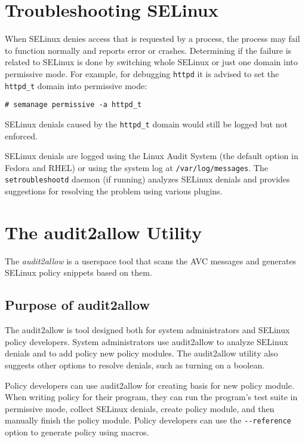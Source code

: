 \section{Troubleshooting SELinux}

When SELinux denies access that is requested by a process, the process may fail
to function normally and reports error or crashes. Determining if the failure is
related to SELinux is done by switching whole SELinux or just one domain into
permissive mode. For example, for debugging \texttt{httpd} it is advised to set
the \texttt{httpd\_t} domain into permissive mode:
\begin{lstlisting}
# semanage permissive -a httpd_t
\end{lstlisting}
SELinux denials caused by the \texttt{httpd\_t} domain would still be logged but
not enforced.

SELinux denials are logged using the Linux Audit System (the default option in
Fedora and RHEL) or using the system log at \texttt{/var/log/messages}. The
\texttt{setroubleshootd} daemon (if running) analyzes SELinux denials and
provides suggestions for resolving the problem using various plugins.

\section{The audit2allow Utility}
The \emph{audit2allow} is a userspace tool that scans the AVC messages and
generates SELinux policy snippets based on them.

\subsection{Purpose of audit2allow}
The audit2allow is tool designed both for system administrators and SELinux
policy developers. System administrators use audit2allow to analyze SELinux
denials and to add policy new policy modules. The audit2allow utility also
suggests other options to resolve denials, such as turning on a boolean.

Policy developers can use audit2allow for creating basis for new policy module.
When writing policy for their program, they can run the program's test suite in
permissive mode, collect SELinux denials, create policy module, and then
manually finish the policy module. Policy developers can use the
\texttt{-{}-reference} option to generate policy using macros.

